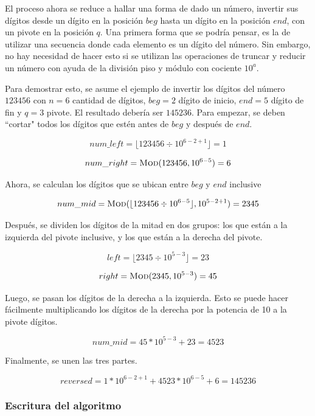 \documentclass[letter]{article}
\begin{document}
El proceso ahora se reduce a hallar una forma de dado un número, invertir sus dígitos desde un dígito en la posición $beg$ hasta un dígito en la posición $end$, con un pivote en la posición $q$. Una primera forma que se podría pensar, es la de utilizar una secuencia donde cada elemento es un dígito del número. Sin embargo, no hay necesidad de hacer esto si se utilizan las operaciones de truncar y reducir un número con ayuda de la división piso y módulo con cociente $10^a$.

Para demostrar esto, se asume el ejemplo de invertir los dígitos del número $123456$ con $n=6$ cantidad de dígitos, $beg=2$ dígito de inicio, $end=5$ dígito de fin y $q=3$ pivote. El resultado debería ser $145236$. Para empezar, se deben ``cortar" todos los dígitos que estén antes de $beg$ y después de $end$.

\[ num\_left = \lfloor 123456 \div 10^{6-2+1} \rfloor = 1 \]

\vspace{-1.2em}

\[ num\_right = \Call{Mod}{123456, 10^{6-5}} = 6 \]

Ahora, se calculan los dígitos que se ubican entre $beg$ y $end$ inclusive

\[ num\_mid = \Call{Mod}{\lfloor 123456 \div 10^{6-5} \rfloor, 10^{5-2+1}} = 2345 \]

Después, se dividen los dígitos de la mitad en dos grupos: los que están a la izquierda del pivote inclusive, y los que están a la derecha del pivote. \par

\[ left = \lfloor 2345 \div 10^{5 - 3} \rfloor = 23 \]

\vspace{-1.2em}

\[ right = \Call{Mod}{ 2345, 10^{5 - 3}} = 45 \]

Luego, se pasan los dígitos de la derecha a la izquierda. Esto se puede hacer fácilmente multiplicando los dígitos de la derecha por la potencia de 10 a la pivote dígitos. \par

\[ num\_mid = 45 * 10^{5 - 3} + 23 = 4523 \]

Finalmente, se unen las tres partes. \par

\[ reversed = 1 * 10^{6-2+1} + 4523 * 10^{6-5} + 6 = 145236 \]

\newpage

\subsubsection{Escritura del algoritmo} \label{algoritmos:dividir:algoritmo}
\end{document}
